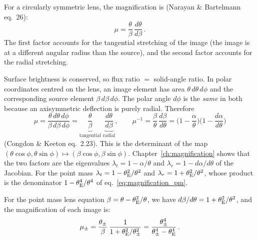 For a circularly symmetric lens, the magnification is
(Narayan \& Bartelmann eq.~26):
\begin{equation}
    \mu = \frac{\theta}{\beta}\, \frac{d\theta}{d\beta} \,.
    \label{eq:magnification_circular}
\end{equation}
The first factor accounts for the tangential stretching of the image
(the image is at a different angular radius than the source), and
the second factor accounts for the radial stretching.
\begin{derivation}[Where $\mu = (\theta/\beta)(d\theta/d\beta)$ comes from]
Surface brightness is conserved, so flux ratio $=$ solid-angle ratio. In polar
coordinates centred on the lens, an image element has area
$\theta\,d\theta\,d\phi$ and the corresponding source element
$\beta\,d\beta\,d\phi$. The polar angle $d\phi$ is the \emph{same} in both
because an axisymmetric deflection is purely radial. Therefore
\begin{equation*}
    \mu = \frac{\theta\,d\theta\,d\phi}{\beta\,d\beta\,d\phi}
        = \underbrace{\frac{\theta}{\beta}}_{\text{tangential}}\;
          \underbrace{\frac{d\theta}{d\beta}}_{\text{radial}},
    \qquad
    \mu^{-1} = \frac{\beta}{\theta}\,\frac{d\beta}{d\theta}
    = \Big(1 - \frac{\alpha}{\theta}\Big)\Big(1 - \frac{d\alpha}{d\theta}\Big)
\end{equation*}
(Congdon \& Keeton eq.~2.23). This is the determinant of the map
$(\theta\cos\phi, \theta\sin\phi) \mapsto (\beta\cos\phi, \beta\sin\phi)$.
Chapter~\ref{ch:magnification} shows that the two factors are the eigenvalues
$\lambda_t = 1 - \alpha/\theta$ and $\lambda_r = 1 - d\alpha/d\theta$ of the
Jacobian. For the point mass $\lambda_t = 1 - \theta_{\mathrm{E}}^2/\theta^2$ and
$\lambda_r = 1 + \theta_{\mathrm{E}}^2/\theta^2$, whose product is the denominator
$1 - \theta_{\mathrm{E}}^4/\theta^4$ of eq.~\eqref{eq:magnification_pm}.
\end{derivation}

For the point mass lens equation $\beta = \theta - \theta_{\mathrm{E}}^2/\theta$,
we have $d\beta/d\theta = 1 + \theta_{\mathrm{E}}^2/\theta^2$, and the
magnification of each image is:
\begin{equation}
    \mu_\pm = \frac{\theta_\pm}{\beta}\,
    \frac{1}{1 + \theta_{\mathrm{E}}^2/\theta_\pm^2}
    = \frac{\theta_\pm^4}{\theta_\pm^4 - \theta_{\mathrm{E}}^4} \,.
    \label{eq:magnification_pm}
\end{equation}

